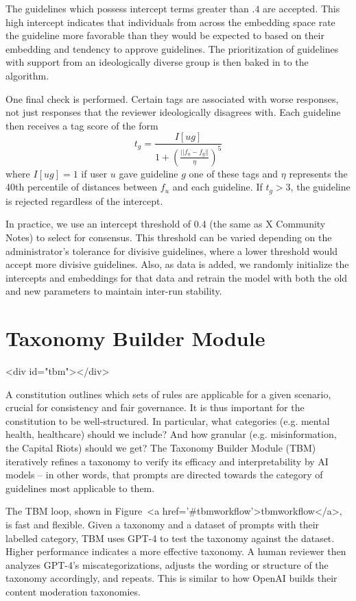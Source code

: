 \documentclass{article}
\begin{document}
\begin{multicols}{2}
The guidelines which possess intercept terms greater than $.4$ are accepted. This high intercept indicates that individuals from across the embedding space rate the guideline more favorable than they would be expected to based on their embedding and tendency to approve guidelines. The prioritization of guidelines with support from an ideologically diverse group is then baked in to the algorithm. 

One final check is performed. Certain tags are associated with worse responses, not just responses that the reviewer ideologically disagrees with. Each guideline then receives a tag score of the form 
$$t_g = \frac{I[ug]}{1 + \left(\frac{||f_u - f_g||}{\eta}\right)^5}$$
where $I[ug]=1$ if user $u$ gave guideline $g$ one of these tags and $\eta$ represents the 40th percentile of distances between $f_u$ and each guideline. If $t_g>3$, the guideline is rejected regardless of the intercept.

In practice, we use an intercept threshold of 0.4 (the same as X Community Notes) to select for consensus. This threshold can be varied depending on the administrator's tolerance for divisive guidelines, where a lower threshold would accept more divisive guidelines. Also, as data is added, we randomly initialize the intercepts and embeddings for that data and retrain the model with both the old and new parameters to maintain inter-run stability.

\section{Taxonomy Builder Module} <div id="tbm"></div>


A constitution outlines which sets of rules are applicable for a given scenario, crucial for consistency and fair governance. It is thus important for the constitution to be well-structured. In particular, what categories (e.g. mental health, healthcare) should we include? And how granular (e.g. misinformation, the Capital Riots) should we get? The Taxonomy Builder Module (TBM) iteratively refines a taxonomy to verify its efficacy and interpretability by AI models -- in other words, that prompts are directed towards the category of guidelines most applicable to them.

The TBM loop, shown in Figure~<a href='#tbmworkflow'>tbmworkflow</a>, is fast and flexible. Given a taxonomy and a dataset of prompts with their labelled category, TBM uses GPT-4 to test the taxonomy against the dataset. Higher performance indicates a more effective taxonomy. A human reviewer then analyzes GPT-4’s miscategorizations, adjusts the wording or structure of the taxonomy accordingly, and repeats. This is similar to how OpenAI builds their content moderation taxonomies. \cite{usinggpt4contentmod}


\end{multicols}
\end{document}
